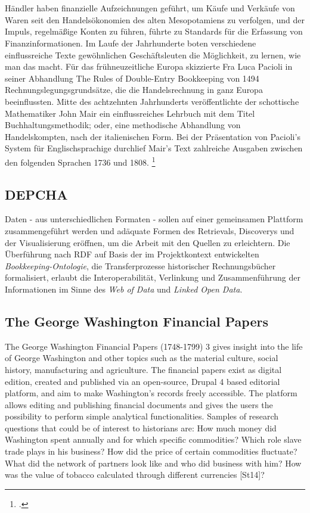 \documentclass[12pt,a4paper]{article}
\begin{document}
\\
\\
Händler haben finanzielle Aufzeichnungen geführt, um Käufe und Verkäufe von Waren seit den Handelsökonomien des alten Mesopotamiens zu verfolgen, und der Impuls, regelmäßige Konten zu führen, führte zu Standards für die Erfassung von Finanzinformationen. Im Laufe der Jahrhunderte boten verschiedene einflussreiche Texte gewöhnlichen Geschäftsleuten die Möglichkeit, zu lernen, wie man das macht. Für das frühneuzeitliche Europa skizzierte Fra Luca Pacioli in seiner Abhandlung The Rules of Double-Entry Bookkeeping von 1494 Rechnungslegungsgrundsätze, die die Handelsrechnung in ganz Europa beeinflussten. Mitte des achtzehnten Jahrhunderts veröffentlichte der schottische Mathematiker John Mair ein einflussreiches Lehrbuch mit dem Titel 
Buchhaltungsmethodik; oder, eine methodische Abhandlung von Handelskompten, nach der italienischen Form. Bei der Präsentation von Pacioli's System für Englischsprachige durchlief Mair's Text zahlreiche Ausgaben zwischen den folgenden Sprachen 1736 und 1808. \footcite[][S.3]{tomasek2013encoding}

\subsection{DEPCHA}

Daten - aus unterschiedlichen Formaten - sollen auf einer gemeinsamen Plattform zusammengeführt werden und adäquate Formen des Retrievals, Discoverys und der Visualisierung eröffnen, um die Arbeit mit den Quellen zu erleichtern. Die Überführung nach RDF auf Basis der im Projektkontext entwickelten \textit{Bookkeeping-Ontologie}, die Transferprozesse historischer Rechnungsbücher formalisiert, erlaubt die Interoperabilität, Verlinkung und Zusammenführung der Informationen im Sinne des \textit{Web of Data} und \textit{Linked Open Data}.


\subsection{The George Washington Financial Papers}
The George Washington Financial Papers (1748-1799) 3 gives insight into the life of
George Washington and other topics such as the material culture, social history,
manufacturing and agriculture. The financial papers exist as digital edition, created and
published via an open-source, Drupal 4 based editorial platform, and aim to make
Washington’s records freely accessible. The platform allows editing and publishing
financial documents and gives the users the possibility to perform simple analytical
functionalities. Samples of research questions that could be of interest to historians are:
How much money did Washington spent annually and for which specific commodities?
Which role slave trade plays in his business? How did the price of certain commodities
fluctuate? What did the network of partners look like and who did business with him?
How was the value of tobacco calculated through different currencies [St14]?
\end{document}
